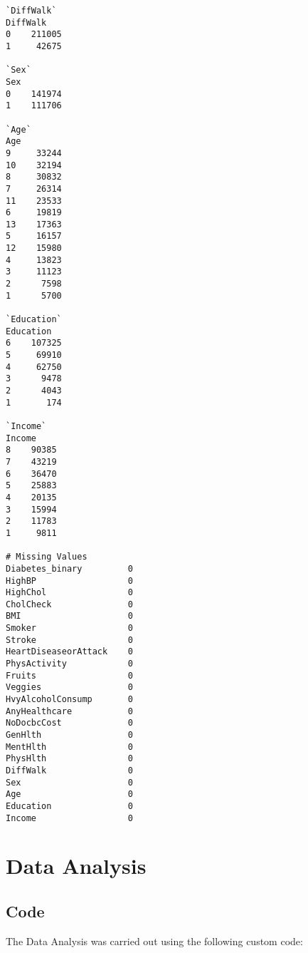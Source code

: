 \documentclass[11pt]{article}
\begin{document}
\begin{Verbatim}[tabsize=4]
`DiffWalk`
DiffWalk
0    211005
1     42675

`Sex`
Sex
0    141974
1    111706

`Age`
Age
9     33244
10    32194
8     30832
7     26314
11    23533
6     19819
13    17363
5     16157
12    15980
4     13823
3     11123
2      7598
1      5700

`Education`
Education
6    107325
5     69910
4     62750
3      9478
2      4043
1       174

`Income`
Income
8    90385
7    43219
6    36470
5    25883
4    20135
3    15994
2    11783
1     9811

# Missing Values
Diabetes_binary         0
HighBP                  0
HighChol                0
CholCheck               0
BMI                     0
Smoker                  0
Stroke                  0
HeartDiseaseorAttack    0
PhysActivity            0
Fruits                  0
Veggies                 0
HvyAlcoholConsump       0
AnyHealthcare           0
NoDocbcCost             0
GenHlth                 0
MentHlth                0
PhysHlth                0
DiffWalk                0
Sex                     0
Age                     0
Education               0
Income                  0
\end{Verbatim}

\section{Data Analysis} \subsection{Code}The Data Analysis was carried out using the following custom code:
\end{document}

